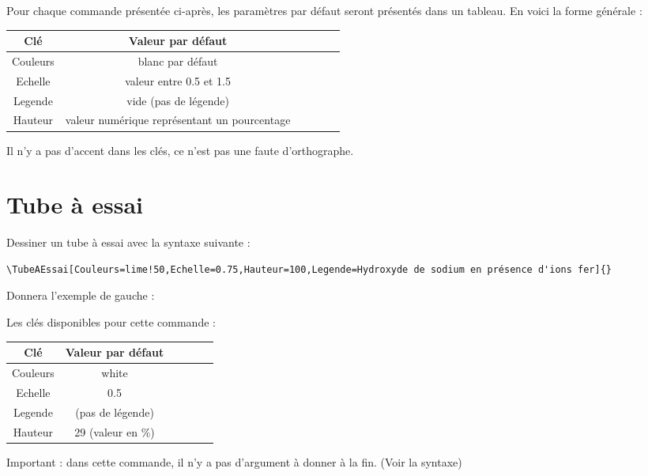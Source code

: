 \documentclass[a4paper,12pt,dvipsnames]{report}
\newcommand{\crh}{\\ \hline}
\begin{document}
Pour chaque commande présentée ci-après, les paramètres par défaut seront présentés dans un tableau. En voici la forme générale :

\begin{center}
\begin{tabularx}{0.75\textwidth}{|C|C|}
\hline 
\textbf{Clé} & \textbf{Valeur par défaut} \crh
Couleurs & blanc par défaut \crh
Echelle & valeur entre 0.5 et 1.5 \crh
Legende & vide (pas de légende) \crh
Hauteur & valeur numérique représentant un pourcentage \crh
\end{tabularx}
\end{center}

Il n'y a pas d'accent dans les clés, ce n'est pas une faute d'orthographe.

\newpage
\thispagestyle{fancy}
\section{Tube à essai}

Dessiner un tube à essai avec la syntaxe suivante :
\vspace{2cm}

\begin{lstlisting}[style=A]
\TubeAEssai[Couleurs=lime!50,Echelle=0.75,Hauteur=100,Legende=Hydroxyde de sodium en présence d'ions fer]{}
\end{lstlisting}
\vspace{2cm}


Donnera l'exemple de gauche :
\begin{center}
\TubeAEssai[Couleurs=lime!50,Echelle=0.75,Hauteur=135,Legende=Hydroxyde de sodium en présence d'ions fer]{} \hspace{0.5cm} \TubeAEssai[Echelle=0.75,Hauteur=75,Legende=Autre version sans couleur]{}
\end{center}

Les clés disponibles pour cette commande :
\begin{center}
\begin{tabularx}{0.5\textwidth}{|C|C|}
\hline 
\textbf{Clé} & \textbf{Valeur par défaut} \crh
Couleurs & white \crh
Echelle & 0.5 \crh
Legende & {} (pas de légende) \crh
Hauteur & 29 (valeur en \%) \crh
\end{tabularx}
\end{center}

Important : dans cette commande, il n'y a pas d'argument à donner à la fin. (Voir la syntaxe)

\newpage
\end{document}
